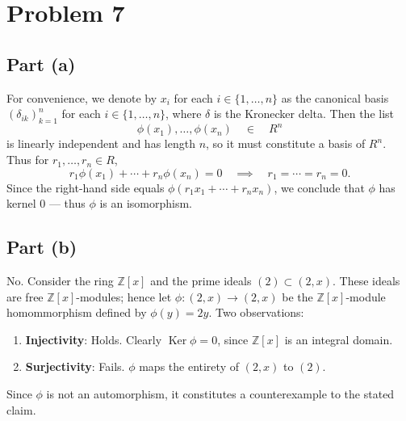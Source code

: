 \documentclass[11pt]{article}
\newcommand{\Ker}{\operatorname{Ker}}
\begin{document}

\section{Problem 7}


\subsection{Part (a)}

For convenience, we denote by $x_{i}$ for each $i \in \{ 1, \ldots, n \}$ as the canonical basis $(\delta_{ik})_{k = 1}^{n}$ for each $i \in \{ 1, \ldots, n \}$, where $\delta$ is the Kronecker delta. Then the list
\[
  \phi(x_{1}), \ldots, \phi(x_{n}) \quad \in \quad R^{n}
\]
is linearly independent and has length $n$, so it must constitute a basis of $R^{n}$. Thus for $r_{1}, \ldots, r_{n} \in R$,
\[
  r_{1} \phi(x_{1}) + \cdots + r_{n} \phi(x_{n}) = 0 \quad \implies \quad r_{1} = \cdots = r_{n} = 0.
\]
Since the right-hand side equals $\phi(r_{1} x_{1} + \cdots + r_{n} x_{n})$, we conclude that $\phi$ has kernel $0$ --- thus $\phi$ is an isomorphism.


\subsection{Part (b)}

$\boxed{\text{No}}$. Consider the ring $\mathbb{Z}[x]$ and the prime ideals $(2) \subset (2, x)$. These ideals are free $\mathbb{Z}[x]$-modules; hence let $\phi : (2, x) \to (2, x)$ be the $\mathbb{Z}[x]$-module homommorphism defined by $\phi(y) = 2y$. Two observations:
\begin{enumerate}
  \item \textbf{Injectivity}: Holds. Clearly $\Ker \phi = 0$, since $\mathbb{Z}[x]$ is an integral domain.
  \item \textbf{Surjectivity}: Fails. $\phi$ maps the entirety of $(2, x)$ to $(2)$.
\end{enumerate}
Since $\phi$ is not an automorphism, it constitutes a counterexample to the stated claim.

\end{document}

